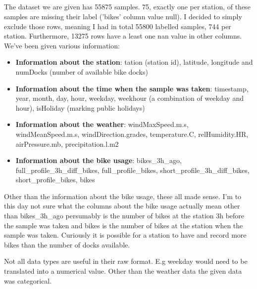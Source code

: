 \documentclass[a4paper]{article}
\begin{document}
    \subsection*{}
    \subsubsection*{}
    The dataset we are given has 55875 samples. 75, exactly one per station, of these samples are missing their label ('bikes'
    column value null).
    I decided to simply exclude those rows, meaning I had in total 55800 labelled samples, 744 per station. Furthermore,
    13275 rows have a least one nan value in other columns.
    We've been given various information:
    \begin{itemize}
        \item \textbf{Information about the station}: tation (station id), latitude, longitude and
        numDocks (number of available bike docks)
        \item \textbf{Information about the time when the sample was taken}: timestamp, year, month, day, hour,
        weekday, weekhour (a combination of weekday and hour), isHoliday (marking public holidays)
        \item \textbf{Information about the weather}: windMaxSpeed.m.s, windMeanSpeed.m.s,  windDirection.grades,
        temperature.C, relHumidity.HR, airPressure.mb, precipitation.l.m2
        \item \textbf{Information about the bike usage}: bikes\_3h\_ago, full\_profile\_3h\_diff\_bikes,
        full\_profile\_bikes, short\_profile\_3h\_diff\_bikes, short\_profile\_bikes, bikes
    \end{itemize}

    Other than the information about the bike usage, these all made sense. I'm to this day not sure what the columns
    about the bike usage actually mean other than bikes\_3h\_ago persumably is the number of bikes at the station 3h
    before the sample was taken and bikes is the number of bikes at the station when the sample was taken. Curiously it
    is possible for a station to have and record more bikes than the number of docks available.

    Not all data types are useful in their raw format. E.g weekday would need to be translated into a numerical value.
    Other than the weather data the given data was categorical.

    \subsubsection*{}
\end{document}
